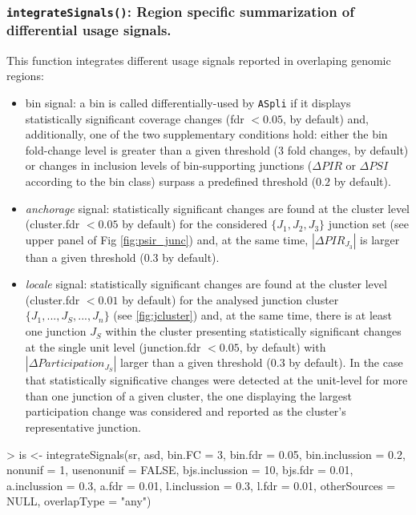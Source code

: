 \documentclass{article}
\begin{document}
\subsubsection{\texttt{integrateSignals()}: Region specific summarization of differential usage signals.}
This function integrates different usage signals reported in overlaping genomic regions:
\begin{itemize}
\item bin signal:  a bin is called differentially-used by \texttt{ASpli} if it displays statistically significant coverage changes (fdr $< 0.05$, by default) and, additionally, one of the two supplementary conditions hold: either the bin fold-change level is greater than a given threshold (3 fold changes, by default) or changes in inclusion levels of bin-supporting junctions ($\Delta PIR$ or $\Delta PSI$ according to the bin class) surpass a predefined threshold ($0.2$ by default).

\item {\em anchorage} signal: statistically significant changes are found at the cluster level (cluster.fdr $<0.05$ by default) for the considered $\{J_1,J_2,J_3\}$ junction set (see upper panel of Fig \ref{fig:psir_junc}) and, at the same time, $|\Delta PIR_{J_3}|$ is larger than a given threshold (0.3 by default).  

\item {\em locale} signal: statistically significant changes are found at the cluster level  (cluster.fdr $<0.01$ by default) for the analysed junction cluster $\{J_1,...,J_S,...,J_n\}$ (see \ref{fig:jcluster}) and, at the same time, there is at least one junction $J_S$ within the cluster presenting statistically significant changes at the single unit level (junction.fdr $<0.05$, by default) with $|\Delta Participation_{J_S}|$ larger than a given threshold (0.3 by default). In the case that statistically significative changes were detected at the unit-level for more than one junction of a given cluster, the one displaying the largest participation change was considered and reported as the cluster's representative junction. 

\end{itemize}

\begin{Schunk}
\begin{Sinput}
> is    <- integrateSignals(sr, asd,
                  bin.FC = 3, bin.fdr = 0.05, bin.inclussion = 0.2,
                  nonunif = 1, usenonunif = FALSE, 
                  bjs.inclussion = 10, bjs.fdr = 0.01, 
                  a.inclussion   = 0.3, a.fdr = 0.01, 
                  l.inclussion   = 0.3, l.fdr = 0.01,
                  otherSources = NULL, overlapType = "any")
\end{Sinput}
\end{Schunk}
\end{document}
